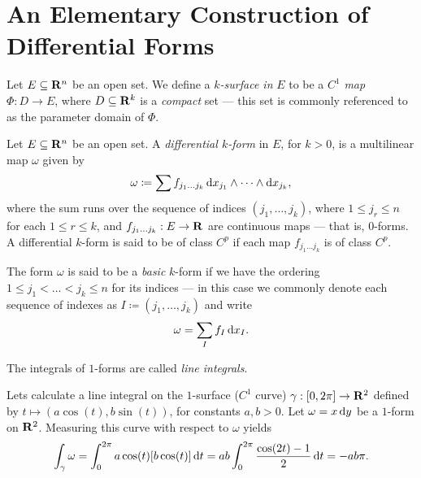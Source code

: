 \section{An Elementary Construction of Differential Forms}

\begin{definition}[\(k\)-surface]
\label{def:k-surface-Rn}
Let \(E \subseteq \mathbf{R}^n\) be an open set. We define a \emph{\(k\)-surface in}
\(E\) to be a \(C^1\) \emph{map} \(\Phi: D \to E\), where \(D \subseteq \mathbf{R}^k\)
is a \emph{compact} set --- this set is commonly referenced to as the parameter
domain of \(\Phi\).
\end{definition}

\begin{definition}
Let \(E \subseteq \mathbf{R}^n\) be an open set. A \emph{differential \(k\)-form} in
\(E\), for \(k > 0\), is a multilinear map \(\omega\) given by
\[
  \omega \coloneq \sum f_{j_1 \dots j_k}\,
  \mathrm{d} x_{j_1} \wedge \dots \wedge \mathrm{d} x_{j_k},
\]
where the sum runs over the sequence of indices \((j_1, \dots, j_k)\), where \(1
\leq j_r \leq n\) for each \(1 \leq r \leq k\), and \(f_{j_1 \dots j_k}: E \to
\mathbf{R}\) are continuous maps --- that is, \(0\)-forms. A differential \(k\)-form is
said to be of class \(C^p\) if each map \(f_{j_1 \dots j_k}\) is of class
\(C^p\).

The form \(\omega\) is said to be a \emph{basic} \(k\)-form if we have the
ordering \(1 \leq j_1 < \dots < j_k \leq n\) for its indices --- in this case we
commonly denote each sequence of indexes as \(I \coloneq (j_1, \dots, j_k)\) and
write
\[
  \omega = \sum_I f_{I}\, \mathrm{d} x_{I}.
\]
\end{definition}

\begin{definition}
\label{def:line-integral}
The integrals of \(1\)-forms are called \emph{line integrals}.
\end{definition}

\begin{example}
Lets calculate a line integral on the \(1\)-surface (\(C^1\) curve)
\(\gamma: [0, 2 \pi] \to \mathbf{R}^2\) defined by \(t \mapsto (a \cos(t), b \sin(t))\),
for constants \(a, b > 0\). Let \(\omega = x\, \mathrm{d} y\) be a \(1\)-form on
\(\mathbf{R}^2\). Measuring this curve with respect to \(\omega\) yields
\[
  \int_{\gamma} \omega = \int_0^{2\pi} a \cos(t) [b \cos(t)]\, \mathrm{d} t
  = ab \int_0^{2 \pi} \frac{\cos(2t) - 1}{2}\, \mathrm{d} t = - ab \pi.
\]
\end{example}

